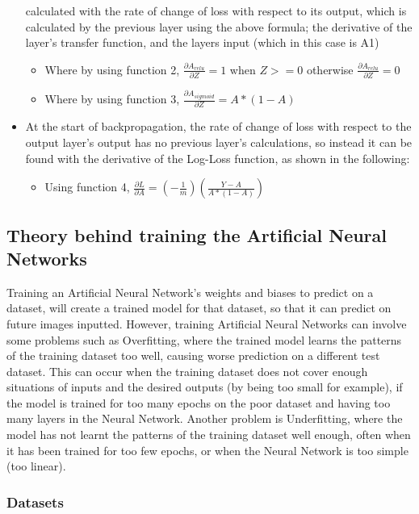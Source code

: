 \documentclass[./project-report/src/latex/project-report.tex]{subfiles}
\begin{document}
\begin{itemize}
          calculated with the rate of change of loss with respect to its output, which is calculated by the previous layer using the above formula; the derivative of 
          the layer's transfer function, and the layers input (which in this case is A1)
    \begin{itemize}
        \item Where by using function 2, $\frac{\partial{A_{relu}}}{\partial{Z}} = 1$ when $Z >= 0$ otherwise $\frac{\partial{A_{relu}}}{\partial{Z}} = 0$
        \item Where by using function 3, $\frac{\partial{A_{sigmoid}}}{\partial{Z}} = A * (1 - A)$
    \end{itemize}
    \item At the start of backpropagation, the rate of change of loss with respect to the output layer's output has no previous layer's calculations, so instead it can 
          be found with the derivative of the Log-Loss function, as shown in the following:
    \begin{itemize}
        \item Using function 4, $\frac{\partial{L}}{\partial{A}} = (-\frac{1}{m})(\frac{Y-A}{A * (1-A)})$
    \end{itemize}
\end{itemize}

\subsection{Theory behind training the Artificial Neural Networks}

Training an Artificial Neural Network's weights and biases to predict on a dataset, will create a trained model for that dataset, so that it can predict on future 
images inputted. However, training Artificial Neural Networks can involve some problems such as Overfitting, where the trained model learns the patterns of the 
training dataset too well, causing worse prediction on a different test dataset. This can occur when the training dataset does not cover enough situations of inputs 
and the desired outputs (by being too small for example), if the model is trained for too many epochs on the poor dataset and having too many layers in the Neural 
Network. Another problem is Underfitting, where the model has not learnt the patterns of the training dataset well enough, often when it has been trained for too few 
epochs, or when the Neural Network is too simple (too linear).

\subsubsection{Datasets}
\vspace{5mm}
\end{document}
